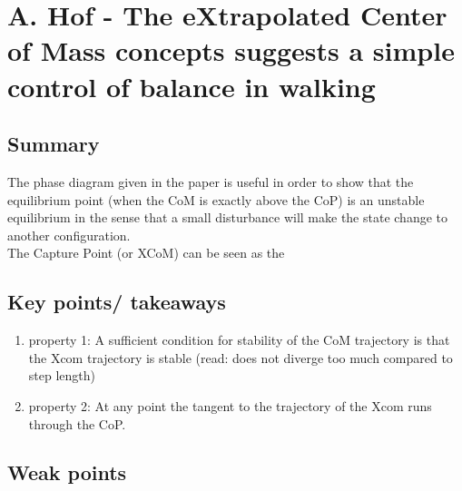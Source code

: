 \section{A. Hof - The eXtrapolated Center of Mass concepts suggests a simple control of balance in walking \cite{AHof}}
\subsection*{Summary}
The phase diagram given in the paper is useful in order to show that the equilibrium point (when the CoM is exactly above the CoP) is an unstable equilibrium in the sense that a small disturbance will make the state change to another configuration.\\
The Capture Point (or XCoM) can be seen as the  
\subsection*{Key points/ takeaways}
\begin{enumerate}
	\item property 1: A sufficient condition for stability of the CoM trajectory is that the Xcom trajectory is stable (read: does not diverge too much compared to step length)
	\item property 2: At any point the tangent to the trajectory of the Xcom runs through the CoP.
\end{enumerate}
\subsection*{Weak points}